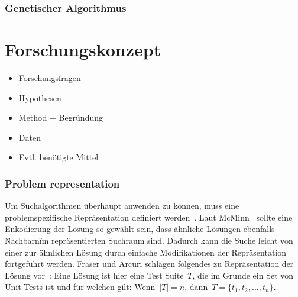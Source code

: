 \documentclass{article}
\begin{document}
\subsubsection{Genetischer Algorithmus}


\section{Forschungskonzept}
\begin{itemize}
    \item Forschungsfragen
    \item Hypothesen
    \item Method + Begründung
    \item Daten
    \item Evtl. benötigte Mittel
\end{itemize}

\subsubsection{Problem representation}
Um Suchalgorithmen überhaupt anwenden zu können, muss eine problemspezifische Repräsentation definiert werden~\cite{Fraser_2013}. Laut McMinn~\cite{McMinn_2004} sollte eine Enkodierung der Lösung so gewählt sein, dass ähnliche Lösungen ebenfalls \"Nachbarn\" im repräsentierten Suchraum sind. Dadurch kann die Suche leicht von einer zur ähnlichen Lösung durch einfache Modifikationen der Repräsentation fortgeführt werden. Fraser und Arcuri schlagen folgendes zu Repräsentation der Lösung vor~\cite{Fraser_2011}: Eine Lösung ist hier eine Test Suite~$T$, die im Grunde ein Set von Unit Tests ist und für welchen gilt: Wenn~$|T| = n$, dann~$T = \{t_1, t_2, ... ,t_n\}$. 
\end{document}
